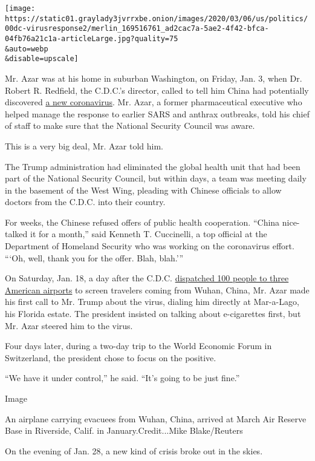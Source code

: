 \texttt{[image: https://static01.graylady3jvrrxbe.onion/images/2020/03/06/us/politics/00dc-virusresponse2/merlin\_169516761\_ad2cac7a-5ae2-4f42-bfca-04fb76a21c1a-articleLarge.jpg?quality=75\\\&auto=webp\\\&disable=upscale]}

Mr. Azar was at his home in suburban Washington, on Friday, Jan. 3, when
Dr. Robert R. Redfield, the C.D.C.'s director, called to tell him China
had potentially discovered
\href{https://www.nytimes3xbfgragh.onion/2020/01/08/health/china-pneumonia-outbreak-virus.html}{a
new coronavirus}. Mr. Azar, a former pharmaceutical executive who helped
manage the response to earlier SARS and anthrax outbreaks, told his
chief of staff to make sure that the National Security Council was
aware.

This is a very big deal, Mr. Azar told him.

The Trump administration had eliminated the global health unit that had
been part of the National Security Council, but within days, a team was
meeting daily in the basement of the West Wing, pleading with Chinese
officials to allow doctors from the C.D.C. into their country.

For weeks, the Chinese refused offers of public health cooperation.
``China nice-talked it for a month,'' said Kenneth T. Cuccinelli, a top
official at the Department of Homeland Security who was working on the
coronavirus effort. ```Oh, well, thank you for the offer. Blah, blah.'''

On Saturday, Jan. 18, a day after the C.D.C.
\href{https://www.nytimes3xbfgragh.onion/2020/01/17/health/china-coronavirus-airport-screening.html}{dispatched
100 people to three American airports} to screen travelers coming from
Wuhan, China, Mr. Azar made his first call to Mr. Trump about the virus,
dialing him directly at Mar-a-Lago, his Florida estate. The president
insisted on talking about e-cigarettes first, but Mr. Azar steered him
to the virus.

Four days later, during a two-day trip to the World Economic Forum in
Switzerland, the president chose to focus on the positive.

``We have it under control,'' he said. ``It's going to be just fine.''

Image

An airplane carrying evacuees from Wuhan, China, arrived at March Air
Reserve Base in Riverside, Calif. in January.Credit...Mike Blake/Reuters

On the evening of Jan. 28, a new kind of crisis broke out in the skies.


